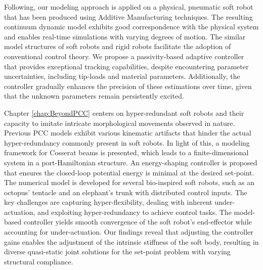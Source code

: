 Following, our modeling approach is applied on a physical, pneumatic soft robot that has been produced using Additive Manufacturing techniques. The resulting continuum dynamic model exhibits good correspondence with the physical system and enables real-time simulations with varying degrees of motion. The similar model structures of soft robots and rigid robots facilitate the adoption of conventional control theory. We propose a passivity-based adaptive controller that provides exceptional tracking capabilities, despite encountering parameter uncertainties, including tip-loads and material parameters. Additionally, the controller gradually enhances the precision of these estimations over time, given that the unknown parameters remain persistently excited.

Chapter \ref{chap:BeyondPCC} centers on hyper-redundant soft robots and their capacity to imitate intricate morphological movements observed in nature. Previous PCC models exhibit various kinematic artifacts that hinder the actual hyper-redundancy commonly present in soft robots. In light of this, a modeling framework for Cosserat beams is presented, which leads to a finite-dimensional system in a port-Hamiltonian structure. An energy-shaping controller is proposed that ensures the closed-loop potential energy is minimal at the desired set-point. The numerical model is developed for several bio-inspired soft robots, such as an octopus' tentacle and an elephant's trunk with distributed control inputs. The key challenges are capturing hyper-flexibility, dealing with inherent under-actuation, and exploiting hyper-redundancy to achieve control tasks. The model-based controller yields smooth convergence of the soft robot's end-effector while accounting for under-actuation. Our findings reveal that adjusting the controller gains enables the adjustment of the intrinsic stiffness of the soft body, resulting in diverse quasi-static joint solutions for the set-point problem with varying structural compliance. 

